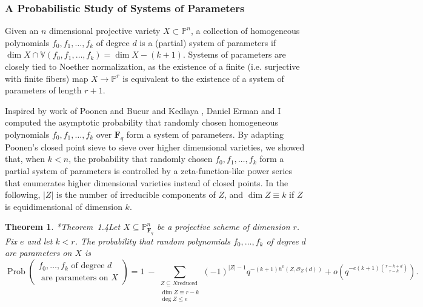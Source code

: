 \documentclass[11pt,reqno]{amsart}
\newtheorem{theorem}[lemma]{Theorem}
\theoremstyle{remark}
\newcommand{\Prob}{\operatorname{Prob}}
\newcommand{\fF}{\mathbf F}
\renewcommand{\O}{\mathcal{O}}
\renewcommand{\P}{\mathbb{P}}
\newcommand{\V}{\mathbb{V}}
\begin{document}
\subsubsection{A Probabilistic Study of Systems of Parameters} 

Given an $n$ dimensional projective variety $X\subset \P^n$, a collection of homogeneous polynomials $f_{0},f_{1},\ldots,f_{k}$ of degree $d$ is a (partial) system of parameters if $\dim X\cap \V(f_{0},f_{1},\ldots,f_{k}) = \dim X - (k+1)$. Systems of parameters are closely tied to Noether normalization, as the existence of a finite (i.e. surjective with finite fibers) map $X\rightarrow \P^r$ is equivalent to the existence of a system of parameters of length $r+1$.

Inspired by work of Poonen \cite{poonen04} and Bucur and Kedlaya \cite{bucurKedlaya12}, Daniel Erman and I computed the asymptotic probability that randomly chosen homogeneous polynomials $f_{0},f_{1},\ldots,f_{k}$ over $\fF_{q}$ form a system of parameters. By adapting Poonen's closed point sieve to sieve over higher dimensional varieties, we showed that, when $k<n$, the probability that randomly chosen $f_{0},f_{1},\ldots,f_{k}$ form a partial system of parameters is controlled by a zeta-function-like power series that enumerates higher dimensional varieties instead of closed points. In the following, $|Z|$ is the number of irreducible components of $Z$, and $\dim Z \equiv k$ if $Z$ is equidimensional of dimension $k$. 

\begin{theorem}\cite{bruceErman-sop}*{Theorem~1.4}\label{thm:main finite field}
Let $X\subseteq \P^n_{\fF_q}$ be a projective scheme of dimension $r$. Fix $e$ and let $k<r$. The probability that random polynomials $f_0,\dots,f_k$ of degree $d$ are parameters on $X$ is
\[
\Prob\left(\begin{matrix}f_0,\dots,f_{k} \text{ of degree $d$ } \\ \text{ are parameters on $X$}\end{matrix}\right) = 1 \ - 
\sum_{\begin{smallmatrix}Z\subseteq X \text{reduced} \\ \dim Z \equiv r-k\\ \deg Z \leq e  \end{smallmatrix}}(-1)^{|Z|-1}q^{-(k+1)h^0(Z,\O_Z(d))}+ o\left(q^{-e(k+1)\binom{r-k+d}{r-k}}\right).
\]
\end{theorem}

\end{document}

